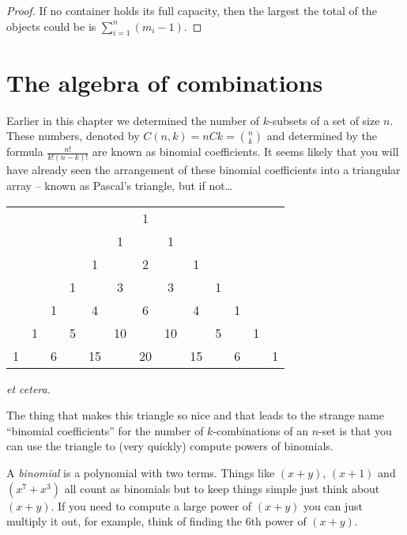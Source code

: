 \begin{proof}
If no container holds its full capacity, then the largest the
total of the objects could be is $\sum_{i=1}^n (m_i - 1)$.
\end{proof}


\clearpage




\clearpage

\section{The algebra of combinations}

Earlier in this chapter we determined the number of $k$-subsets of a set
of size $n$.  These numbers, denoted by $C(n,k) = nCk = \binom{n}{k}$
and determined by the formula $\frac{n!}{k!(n-k)!}$ are known as binomial 
coefficients.  It seems likely that you will have already seen the arrangement
of these binomial coefficients into a triangular array -- known as 
 Pascal's triangle, but if not\ldots

\begin{center}
\begin{tabular}{ccccccccccccc}
  &   &   &   &    &    & 1  &    &    &   &   &   &   \\
  &   &   &   &    & 1  &    & 1  &    &   &   &   &   \\
  &   &   &   &  1 &    & 2  &    & 1  &   &   &   &   \\
  &   &   & 1 &    & 3  &    & 3  &    & 1 &   &   &   \\
  &   & 1 &   &  4 &    & 6  &    & 4  &   & 1 &   &   \\
  & 1 &   & 5 &    & 10 &    & 10 &    & 5 &   & 1 &   \\
1 &   & 6 &   & 15 &    & 20 &    & 15 &   & 6 &   & 1 \\
\end{tabular}
\end{center}

\noindent \emph{et cetera.}

The thing that makes this triangle so nice and that leads to the
strange name ``binomial coefficients'' for the number of $k$-combinations
of an $n$-set is that you can use the triangle to (very quickly) compute
powers of binomials.

A \emph{binomial} is a polynomial with two terms.
Things like $(x+y)$, $(x+1)$ and $(x^7+x^3)$ all count as binomials
but to keep things simple just think about $(x+y)$.  If you need to
compute a large power of $(x+y)$ you can just multiply it out, for
example, think of finding the 6th power of $(x+y)$.

